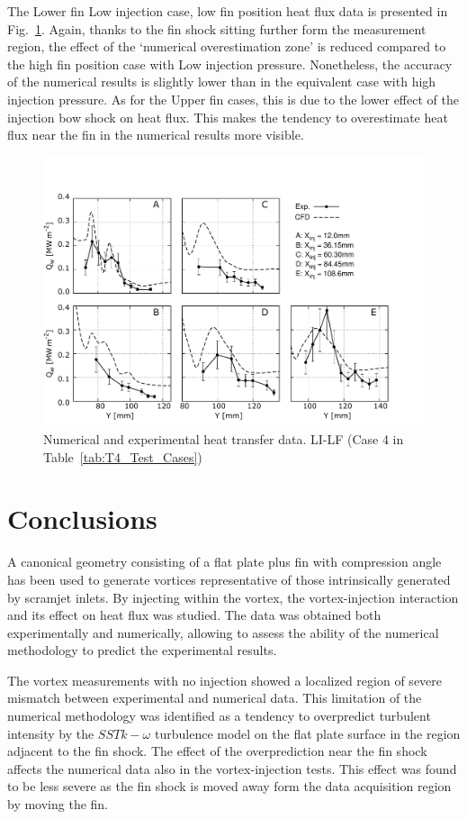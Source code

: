 \documentclass{AIAA}
\begin{document}
The Lower fin Low injection case, low fin position heat flux data is presented in Fig.~\ref{fig:HeatFluxLPLILF}. Again, thanks to the fin shock sitting further form the measurement region, the effect of the `numerical overestimation zone' is reduced compared to the high fin position case with Low injection pressure. 
Nonetheless, the accuracy of the numerical results is slightly lower than in the equivalent case with high injection pressure. As for the Upper fin cases, this is due to the lower effect of the injection bow shock on heat flux. This makes the tendency to overestimate heat flux near the fin in the numerical results more visible. 
%
\begin{figure}[!h]
\center
\includegraphics[trim = 0mm 3mm 25mm 25mm, clip, width=0.60\columnwidth,valign=t,fbox]{Figures/Data/LP_LI_LF/GNUP_CFD_GaugesLines_Multi.pdf}
\caption{Numerical and experimental heat transfer data. LI-LF (Case 4 in Table~\ref{tab:T4_Test_Cases})}
\label{fig:HeatFluxLPLILF}
\end{figure} 



\section{Conclusions}

A canonical geometry consisting of a flat plate plus fin with compression angle has been used to generate vortices representative of those intrinsically generated by scramjet inlets. By injecting within the vortex, the vortex-injection interaction and its effect on heat flux was studied. The data was obtained both experimentally and numerically, allowing to assess the ability of the numerical methodology to predict the experimental results.

The vortex measurements with no injection showed a localized region of severe mismatch between experimental and numerical data. This limitation of the numerical methodology was identified as a tendency to overpredict turbulent intensity by the $SST k-\omega$ turbulence model on the flat plate surface in the region adjacent to the fin shock. The effect of the overprediction near the fin shock affects the numerical data also in the vortex-injection tests. This effect was found to be less severe as the fin shock is moved away form the data acquisition region by moving the fin.
\end{document}
